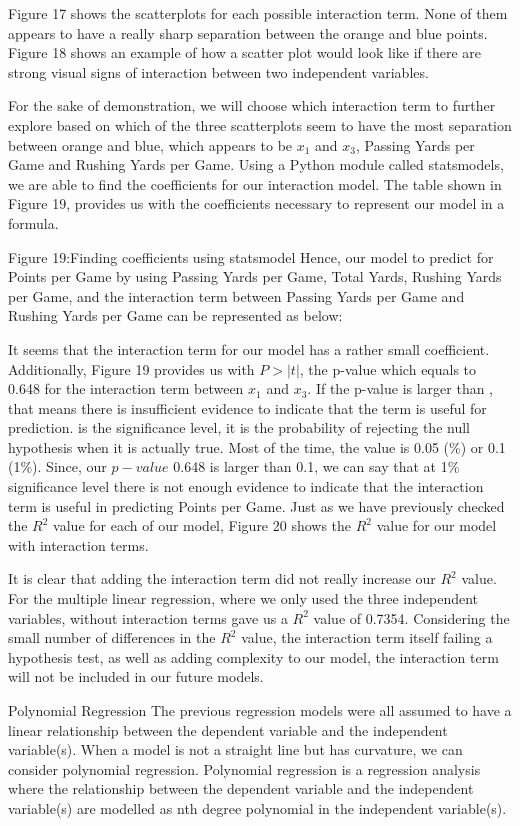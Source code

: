 \documentclass[a4paper,12pt]{report}
\begin{document}
Figure 17 shows the scatterplots for each possible interaction term. None of them appears to have a really sharp separation between the orange and blue points. Figure 18 shows an example of how a scatter plot would look like if there are strong visual signs of interaction between two independent variables.

For the sake of demonstration, we will choose which interaction term to further explore based on which of the three scatterplots seem to have the most separation between orange and blue, which appears to be $x_1$ and $x_3$, Passing Yards per Game and Rushing Yards per Game. Using a Python module called statsmodels, we are able to find the coefficients for our interaction model. The table shown in Figure 19, provides us with the coefficients necessary to represent our model in a formula.

Figure 19:Finding coefficients using statsmodel
Hence, our model to predict for Points per Game by using Passing Yards per Game, Total Yards, Rushing Yards per Game, and the interaction term between Passing Yards per Game and Rushing Yards per Game can be represented as below:

It seems that the interaction term for our model has a rather small coefficient. Additionally, Figure 19 provides us with $P>|t|$, the p-value which equals to 0.648 for the interaction term between $x_1$ and $x_3$. If the p-value is larger than , that means there is insufficient evidence to indicate that the term is useful for prediction.  is the significance level, it is the probability of rejecting the null hypothesis when it is actually true. Most of the time, the  value is 0.05 (\%) or 0.1 (1\%). Since, our $p-value$ 0.648 is larger than 0.1, we can say that at 1\% significance level there is not enough evidence to indicate that the interaction term is useful in predicting Points per Game. Just as we have previously checked the $R^2$  value for each of our model, Figure 20 shows the $R^2$ value for our model with interaction terms.

It is clear that adding the interaction term did not really increase our $R^2$ value. For the multiple linear regression, where we only used the three independent variables, without interaction terms gave us a $R^2$ value of 0.7354. Considering the small number of differences in the $R^2$ value, the interaction term itself failing a hypothesis test, as well as adding complexity to our model, the interaction term will not be included in our future models.

Polynomial Regression
The previous regression models were all assumed to have a linear relationship between the dependent variable and the independent variable(s). When a model is not a straight line but has curvature, we can consider polynomial regression. Polynomial regression is a regression analysis where the relationship between the dependent variable and the independent variable(s) are modelled as nth degree polynomial in the independent variable(s).
 
\end{document}
